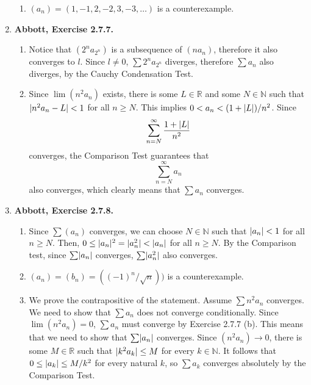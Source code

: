 \documentclass{article}
\DeclarePairedDelimiter\abs{\lvert}{\rvert}
\newcommand{\N}{\mathbb{N}}
\newcommand{\R}{\mathbb{R}}
\newcommand{\ra}{\rightarrow}
\newcommand{\exc}[2][Abbott]{\item \textbf{#1, Exercise #2.}}
\begin{document}
\begin{enumerate}
\begin{enumerate}
        \item $(a_n) = (1,-1,2,-2,3,-3, \dots)$ is a counterexample.
    \end{enumerate}
    
    \exc{2.7.7}
    \begin{enumerate}
        \item Notice that $(2^n a_{2^n})$ is a subsequence of $(n a_n)$, therefore it also converges to $l$. Since $l \neq 0$, $\sum 2^n a_{2^n}$ diverges, therefore $\sum a_n$ also diverges, by the Cauchy Condensation Test.
        
        \item Since $\lim(n^2 a_n)$ exists, there is some $L \in \R$ and some $N \in \N$ such that $\abs{n^2 a_n - L} < 1$ for all $n \geq N$. This implies $0 < a_n < (1+\abs{L})/n^2$. Since 
        \begin{equation*}
            \sum_{n = N}^\infty \frac{1+\abs{L}}{n^2}
        \end{equation*} converges, the Comparison Test guarantees that 
        \begin{equation*}
            \sum_{n = N}^\infty a_n 
        \end{equation*} also converges, which clearly means that $\sum a_n$ converges.
    \end{enumerate}
    
    \exc{2.7.8}
    \begin{enumerate}
        \item Since $\sum (a_n)$ converges, we can choose $N \in \N$ such that $\abs{a_n} < 1$ for all $n \geq N$. Then, $0 \leq \abs{a_n}^2 = \abs{a_n^2} < \abs{a_n}$ for all $n \geq N$. By the Comparison test, since $\sum \abs{a_n}$ converges, $\sum \abs{a_n^2}$ also converges.
        
        \item $(a_n) = (b_n) = ((-1)^n/\sqrt{n}))$ is a counterexample.
        
        \item We prove the contrapositive of the statement. Assume $\sum n^2 a_n$ converges. We need to show that $\sum a_n$ does not converge conditionally. Since $\lim (n^2 a_n) = 0$, $\sum a_n$ must converge by Exercise 2.7.7 (b). This means that we need to show that $\sum \abs{a_n}$ converges. Since $(n^2 a_n) \ra 0$, there is some $M \in \R$ such that $\abs{k^2 a_k} \leq M$ for every $k \in \N$. It follows that $0 \leq \abs{a_k} \leq M/k^2$ for every natural $k$, so $\sum a_k$ converges absolutely by the Comparison Test.
    \end{enumerate}
    

\end{enumerate}
\end{document}

